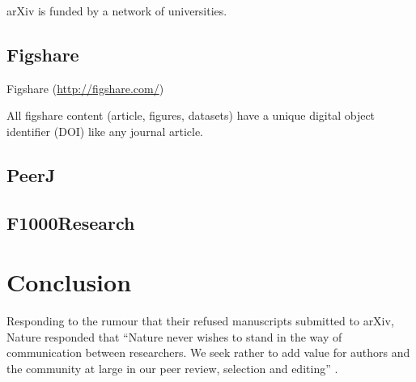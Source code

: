\documentclass[letterpaper,twocolumn,superscriptaddress,showkeys]{revtex4}
\begin{document}
arXiv is funded by a network of universities.

\subsection{Figshare}

Figshare (\href{http://figshare.com/}{http://figshare.com/})

All figshare content (article, figures, datasets) have a unique digital object
identifier (DOI) like any journal article.

\subsection{PeerJ}


\subsection{F1000Research}


\section{Conclusion}


Responding to the rumour that their refused manuscripts submitted to arXiv,
Nature responded that ``Nature never wishes to stand in the way of communication
between researchers. We seek rather to add value for authors and the community
at large in our peer review, selection and editing'' \cite{nat05}.

\newpage


\end{document}
